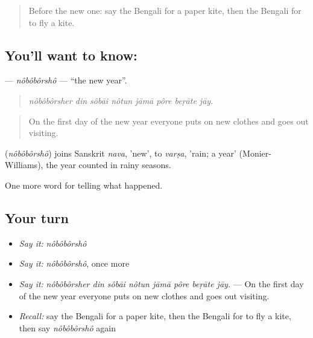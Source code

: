 \label{lesson:BN-C309-noboborsho}



\begin{quote}
Before the new one: say the Bengali for a paper kite, then the Bengali for to fly a kite.
\end{quote}

\subsection*{You'll want to know: }
\textbf{} — \emph{nôbôbôrshô} — \textquotedblleft{}the new year\textquotedblright{}.

\begin{quote}
       
\end{quote}

\begin{quote}
\emph{nôbôbôrsher din sôbāi nôtun jāmā pôre beṛāte jāy.}
\end{quote}

\begin{quote}
On the first day of the new year everyone puts on new clothes and goes out visiting.
\end{quote}

\begin{cousinweb}
\textbf{} (\emph{nôbôbôrshô}) joins Sanskrit \emph{nava}, 'new', to \emph{varṣa}, 'rain; a year' (Monier-Williams), the year counted in rainy seasons.
\end{cousinweb}

\begin{grammarlens}[title={What you've built}]
One more word for telling what happened.
\end{grammarlens}

\subsection*{Your turn}
\begin{itemize}
\raggedright
  \item \emph{Say it:} \emph{nôbôbôrshô}
  \item \emph{Say it:} \emph{nôbôbôrshô}, once more
  \item \emph{Say it:} \emph{nôbôbôrsher din sôbāi nôtun jāmā pôre beṛāte jāy.} — On the first day of the new year everyone puts on new clothes and goes out visiting.
  \item \emph{Recall:} say the Bengali for a paper kite, then the Bengali for to fly a kite, then say \emph{nôbôbôrshô} again
\end{itemize}

